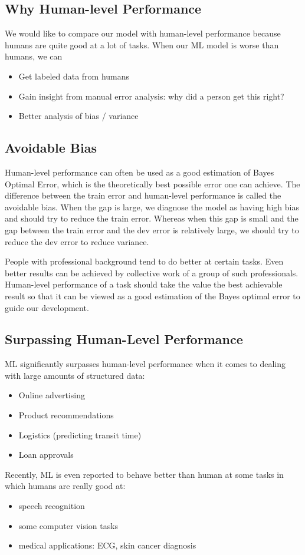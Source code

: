 \subsection{Why Human-level Performance}
We would like to compare our model with human-level performance because humans are quite good at a lot of tasks. When our ML model is worse than humans, we can 
\begin{itemize}
  \item Get labeled data from humans
  \item Gain insight from manual error analysis: why did a person get this right?
  \item Better analysis of bias / variance
\end{itemize}
\subsection{Avoidable Bias}
Human-level performance can often be used as a good estimation of Bayes Optimal Error, which is the theoretically best possible error one can achieve. The difference between the train error and human-level performance is called the avoidable bias. When the gap is large, we diagnose the model as having high bias and should try to reduce the train error. Whereas when this gap is small and the gap between the train error and the dev error is relatively large, we should try to reduce the dev error to reduce variance.

People with professional background tend to do better at certain tasks. Even better results can be achieved by collective work of a group of such professionals. Human-level performance of a task should take the value the best achievable result so that it can be viewed as a good estimation of the Bayes optimal error to guide our development.
\subsection{Surpassing Human-Level Performance}
ML significantly surpasses human-level performance when it comes to dealing with large amounts of structured data:
\begin{itemize}
\item Online advertising
\item Product recommendations
\item Logistics (predicting transit time)
\item Loan approvals
\end{itemize}
Recently, ML is even reported to behave better than human at some tasks in which humans are really good at:
\begin{itemize}
  \item speech recognition
  \item some computer vision tasks
  \item medical applications: ECG, skin cancer diagnosis
\end{itemize}
